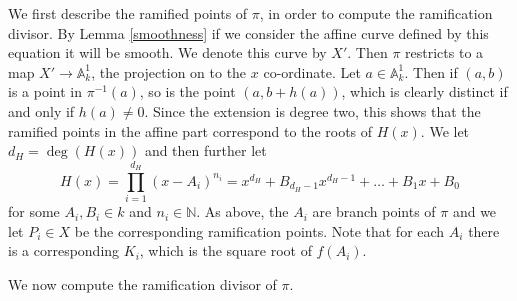 We first describe the ramified points of $\pi$, in order to compute the ramification divisor.
By Lemma \ref{smoothness} if we consider the affine curve defined by this equation it will be smooth.
We denote this curve by $X'$.
Then $\pi$ restricts to a map $X'\rightarrow \mathbb A^1_k$, the projection on to the $x$ co-ordinate.
Let $a\in \mathbb A_k^1$.
Then if $(a,b)$ is a point in $\pi^{-1}(a)$, so is the point $(a,b+h(a))$, which is clearly distinct if and only if $h(a)\neq 0$.
Since the extension is degree two, this shows that the ramified points in the affine part correspond to the roots of $H(x)$.
We let $d_H = \deg(H(x))$ and then further let
    \begin{equation}\label{equationcapitalh}
    H(x) = \prod_{i=1}^{d_H} (x-A_i)^{n_i} = x^{d_H} + B_{{d_H}-1}x^{{d_H}-1} + \ldots + B_1x + B_0
    \end{equation}
for some $A_i, B_i \in  k$ and $n_i \in \mathbb N$.
As above, the $A_i$ are branch points of $\pi$ and we let $P_i \in X$ be the corresponding ramification points.
Note that for each $A_i$ there is a corresponding $K_i$, which is the square root of $f(A_i)$.

We now compute the ramification divisor of $\pi$.


